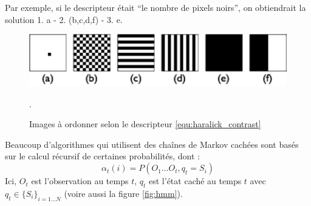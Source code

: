 \documentclass[11pt,addpoints]{exam}
\begin{document}
\begin{questions}
\begin{parts}
Par exemple, si le descripteur était ``le nombre de pixels noirs'', on
obtiendrait la solution 1. a - 2. (b,c,d,f) - 3. e. 
\end{parts}

\begin{figure}[!ht]
\centering
\includegraphics[scale=0.8]{Haralick_question.pdf}
\caption{Images à ordonner selon le descripteur
  \ref{equ:haralick_contrast} }. 
\label{fig:haralick}
\end{figure}

Beaucoup d'algorithmes qui utilisent des chaînes de Markov cachées sont basés
sur le calcul récursif de certaines probabilités, dont : 
\begin{equation}\label{equ:alpha}
\alpha_t(i) = P(O_1\ldots O_t, q_t=S_i) 
\end{equation}
Ici, $O_t$ est l'observation au temps $t$, $q_t$ est l'état caché au
temps $t$ avec $q_t \in \{S_i\}_{i=1 \ldots N}$ (voire aussi la figure
\ref{fig:hmm}).



\end{questions}
\end{document}

